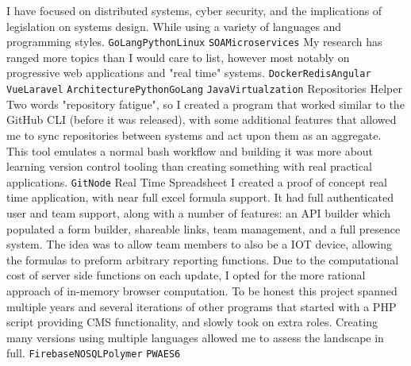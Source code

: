 \documentclass[9pt]{developercv} %
\begin{document}
\begin{entrylist}
    {
        I have focused on distributed systems, cyber security, and the
        implications of legislation on systems design. While using a variety of
        languages and programming styles.
        \texttt{GoLang}\slashsep\texttt{Python}\slashsep\texttt{Linux}
        \slashsep\texttt{SOA}\slashsep\texttt{Microservices}
    }
    {
        My research has ranged more topics than I would care to list, however
        most notably on progressive web applications and "real time" systems.
        \texttt{Docker}\slashsep\texttt{Redis}\slashsep\texttt{Angular}
        \slashsep\texttt{Vue}\slashsep\texttt{Laravel}\slashsep
        \texttt{Architecture}\slashsep\texttt{Python}\slashsep\texttt{GoLang}
        \slashsep\texttt{Java}\slashsep\texttt{Virtualzation}
    }
     {Repositories Helper} {}
    {
        Two words "repository fatigue", so I created a program that worked
        similar to the GitHub CLI (before it was released), with some additional
        features that allowed me to sync repositories between systems and act
        upon them as an aggregate. This tool emulates a normal bash workflow and
        building it was more about learning version control tooling than creating
        something with real practical applications.
        \texttt{Git}\slashsep\texttt{Node}
    }
     {Real Time Spreadsheet} {}
    {
        I created a proof of concept real time application, with near full excel
        formula support. It had full authenticated user and team support, along
        with a number of features: an API builder which populated a form builder,
        shareable links, team management, and a full presence system. The idea
        was to allow team members to also be a IOT device, allowing the formulas
        to preform arbitrary reporting functions. Due to the computational cost
        of server side functions on each update, I opted for the more rational
        approach of in-memory browser computation. To be honest this project
        spanned multiple years and several iterations of other programs that
        started with a PHP script providing CMS functionality, and slowly took on
        extra roles. Creating many versions using multiple languages allowed me to
        assess the landscape in full.
        \texttt{Firebase}\slashsep\texttt{NOSQL}\slashsep\texttt{Polymer}\slashsep
        \texttt{PWA}\slashsep\texttt{ES6}
    }
\end{entrylist}



\vspace{1cm}

\cvfooter
\end{document}
